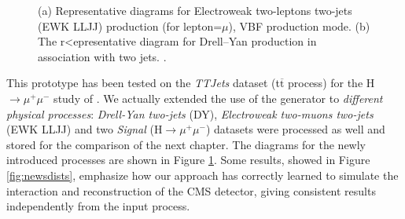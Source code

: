 \begin{figure}
    \myfloatalign
    \caption[EWK LLJJ and DY diagrams]{ (a) Representative diagrams for Electroweak two-leptons two-jets (EWK LLJJ) production (for lepton=$\mu$), VBF production mode. (b) The  r<epresentative diagram for Drell–Yan production in association with two jets. .}\label{fig:newdiag}
    
\end{figure}

This prototype has been tested on the \emph{TTJets} dataset (t$\overline{\text{t}}$ process) for the H$\rightarrow\mu^+\mu^-$ study of \cite{Sirunyan_2021}. We actually extended the use of the generator to \emph{different physical processes}: \emph{Drell-Yan two-jets} (DY), \emph{Electroweak two-muons two-jets} (EWK LLJJ) and two \emph{Signal} (H$\rightarrow\mu^+\mu^-$) datasets were processed as well and stored for the comparison of the next chapter. The diagrams for the newly introduced processes are shown in Figure \ref{fig:newdiag}. Some results, showed in Figure \ref{fig:newsdists}, emphasize how our approach has correctly learned to simulate the interaction and reconstruction of the CMS detector, giving consistent results independently from the input process.

